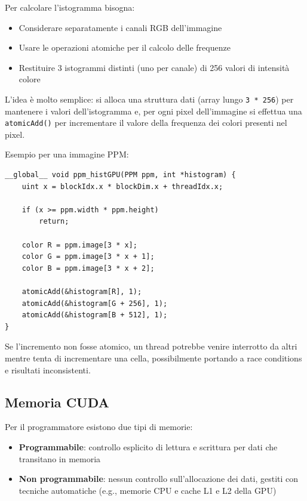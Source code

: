 Per calcolare l'istogramma bisogna: 
\begin{itemize}
	\item Considerare separatamente i canali RGB dell'immagine
	
	\item Usare le operazioni atomiche per il calcolo delle frequenze 
	
	\item Restituire 3 istogrammi distinti (uno per canale) di 256 valori di intensità colore
\end{itemize}

L'idea è molto semplice: si alloca una struttura dati (array lungo \texttt{3 * 256}) per mantenere i valori dell'istogramma e, per ogni pixel dell'immagine si effettua una \texttt{atomicAdd()} per incrementare il valore della frequenza dei colori presenti nel pixel. 

Esempio per una immagine PPM: 
\begin{verbatim}
__global__ void ppm_histGPU(PPM ppm, int *histogram) {
	uint x = blockIdx.x * blockDim.x + threadIdx.x;
	
	if (x >= ppm.width * ppm.height)
		return;
	
	color R = ppm.image[3 * x];
	color G = ppm.image[3 * x + 1];
	color B = ppm.image[3 * x + 2];
	
	atomicAdd(&histogram[R], 1);
	atomicAdd(&histogram[G + 256], 1);
	atomicAdd(&histogram[B + 512], 1);
}
\end{verbatim}

Se l'incremento non fosse atomico, un thread potrebbe venire interrotto da altri mentre tenta di incrementare una cella, possibilmente portando a race conditions e risultati inconsistenti.

\subsection{Memoria CUDA}

Per il programmatore esistono due tipi di memorie: 
\begin{itemize}
	\item \textbf{Programmabile}: controllo esplicito di lettura e scrittura per dati che transitano in memoria
	
	\item \textbf{Non programmabile}: nessun controllo sull'allocazione dei dati, gestiti con tecniche automatiche (e.g., memorie CPU e cache L1 e L2 della GPU)
\end{itemize}

